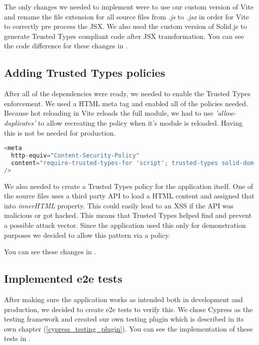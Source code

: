 The only changes we needed to implement were to use our custom version of Vite and rename the file
extension for all source files from \emph{.js} to \emph{.jsx} in order for Vite to correctly pre
process the JSX. We also used the custom version of Solid.js to generate Trusted Types compliant
code after JSX transformation. You can see the code difference for these changes in
\cite{solid_realworld_project:vite}.

\subsection{Adding Trusted Types policies}

After all of the dependencies were ready, we needed to enable the Trusted Types enforcement. We used
a HTML meta tag and enabled all of the policies needed. Because hot reloading in Vite reloads the
full module, we had to use \textit{'allow-duplicates'} to allow recreating the policy when it's
module is reloaded. Having this is not be needed for production.

\bigskip
\begin{lstlisting}[language=JavaScript, caption=Creation of style elements using innerHTML in Vite \cite{commit_vite_inner_html_styles}]
<meta
  http-equiv="Content-Security-Policy"
  content="require-trusted-types-for 'script'; trusted-types solid-dom-expressions trusted-article vite-overlay 'allow-duplicates';"
/>
\end{lstlisting}

We also needed to create a Trusted Types policy for the application itself. One of the source files
uses a third party API to load a HTML content and assigned that into \emph{innerHTML} property. This
could easily lead to an XSS if the API was malicious or got hacked. This means that Trusted Types
helped find and prevent a possible attack vector. Since the application used this only for
demonstration purposes we decided to allow this pattern via a policy.

You can see these changes in \cite{solid_realworld_project:tt_policy}.

\subsection{Implemented e2e tests}

After making sure the application works as intended both in development and production, we decided
to create e2e tests to verify this. We chose Cypress as the testing framework and created our own
testing plugin which is described in its own chapter (\ref{cypress_testing_plugin}). You can see the
implementation of these tests in \cite{solid_realworld_project:tests}.
